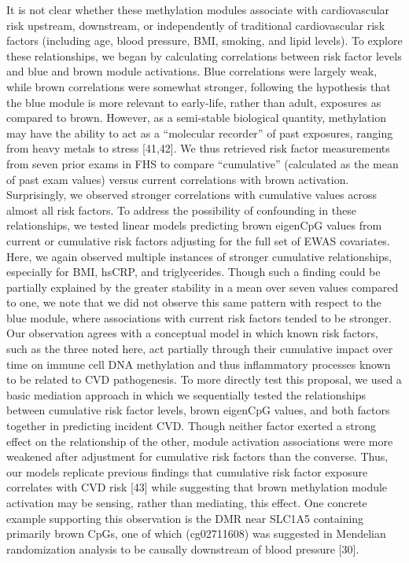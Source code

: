\documentclass[]{article}
\theoremstyle{definition}
\theoremstyle{definition}
\theoremstyle{definition}
\theoremstyle{remark}
\begin{document}
It is not clear whether these methylation modules associate with
cardiovascular risk upstream, downstream, or independently of
traditional cardiovascular risk factors (including age, blood pressure,
BMI, smoking, and lipid levels). To explore these relationships, we
began by calculating correlations between risk factor levels and blue
and brown module activations. Blue correlations were largely weak,
while brown correlations were somewhat stronger, following the
hypothesis that the blue module is more relevant to early-life, rather
than adult, exposures as compared to brown. However, as a semi-stable
biological quantity, methylation may have the ability to act as a
``molecular recorder'' of past exposures, ranging from heavy metals to
stress {[}41,42{]}. We thus retrieved risk factor measurements from
seven prior exams in FHS to compare ``cumulative'' (calculated as the
mean of past exam values) versus current correlations with brown
activation. Surprisingly, we observed stronger correlations with
cumulative values across almost all risk factors. To address the
possibility of confounding in these relationships, we tested linear
models predicting brown eigenCpG values from current or cumulative risk
factors adjusting for the full set of EWAS covariates. Here, we again
observed multiple instances of stronger cumulative relationships,
especially for BMI, hsCRP, and triglycerides. Though such a finding
could be partially explained by the greater stability in a mean over
seven values compared to one, we note that we did not observe this same
pattern with respect to the blue module, where associations with current
risk factors tended to be stronger. Our observation agrees with a
conceptual model in which known risk factors, such as the three noted
here, act partially through their cumulative impact over time on immune
cell DNA methylation and thus inflammatory processes known to be related
to CVD pathogenesis. To more directly test this proposal, we used a
basic mediation approach in which we sequentially tested the
relationships between cumulative risk factor levels, brown eigenCpG
values, and both factors together in predicting incident CVD. Though
neither factor exerted a strong effect on the relationship of the other,
module activation associations were more weakened after adjustment for
cumulative risk factors than the converse. Thus, our models replicate
previous findings that cumulative risk factor exposure correlates with
CVD risk {[}43{]} while suggesting that brown methylation module
activation may be sensing, rather than mediating, this effect. One
concrete example supporting this observation is the DMR near SLC1A5
containing primarily brown CpGs, one of which (cg02711608) was
suggested in Mendelian randomization analysis to be causally downstream
of blood pressure {[}30{]}.
\end{document}
